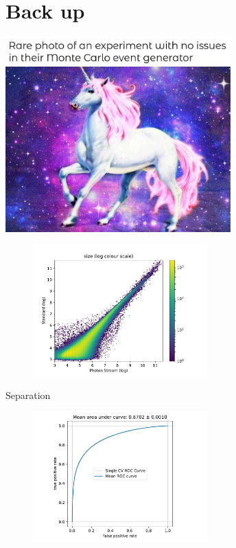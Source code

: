 \section{Back up}
\appendix

\begin{frame}[t]{}
  \centering
  \includegraphics[width=0.65\textwidth]{fig/unicorn.jpg}
\end{frame}

\begin{frame}[t]
    \begin{figure}
        \centering
        \includegraphics[width=0.6\textwidth]{fig/size_compare.pdf}
    \end{figure}
\end{frame}

\begin{frame}[t]{Separation}
    \begin{figure}
        \centering
        \includegraphics[width=0.6\textwidth,page=2]{fig/separation_performance.pdf}
    \end{figure}
\end{frame}

